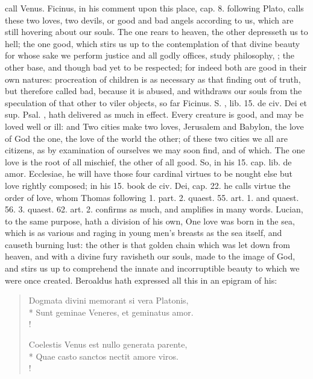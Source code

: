 {call Venus. Ficinus, in his comment upon this place, cap. 8. following
Plato, calls these two loves, two devils, or good and bad angels
according to us, which are still hovering about our souls. The
one rears to heaven, the other depresseth us to hell; the one good,
which stirs us up to the contemplation of that divine beauty for whose
sake we perform justice and all godly offices, study philosophy, \etc{};
the other base, and though bad yet to be respected; for indeed both are
good in their own natures: procreation of children is as necessary as
that finding out of truth, but therefore called bad, because it is
abused, and withdraws our souls from the speculation of that other to
viler objects, so far Ficinus. S. \Austin{}, lib. 15. de civ. Dei et sup.
Psal. , hath delivered as much in effect. Every creature is
good, and may be loved well or ill: and Two cities make two
loves, Jerusalem and Babylon, the love of God the one, the love of the
world the other; of these two cities we all are citizens, as by
examination of ourselves we may soon find, and of which. The one love
is the root of all mischief, the other of all good. So, in his 15. cap.
lib. de amor. Ecclesiae, he will have those four cardinal virtues to be
nought else but love rightly composed; in his 15. book de civ. Dei,
cap. 22. he calls virtue the order of love, whom Thomas following 1.
part. 2. quaest. 55. art. 1. and quaest. 56. 3. quaest. 62. art. 2.
confirms as much, and amplifies in many words. Lucian, to the
same purpose, hath a division of his own, One love was born in the sea,
which is as various and raging in young men's breasts as the sea
itself, and causeth burning lust: the other is that golden chain which
was let down from heaven, and with a divine fury ravisheth our souls,
made to the image of God, and stirs us up to comprehend the innate and
incorruptible beauty to which we were once created. Beroaldus hath
expressed all this in an epigram of his:

\begin{latin}
\begin{verse}%
Dogmata divini memorant si vera Platonis,\\*
Sunt geminae Veneres, et geminatus amor.\\!

Coelestis Venus est nullo generata parente,\\*
Quae casto sanctos nectit amore viros.\\!


\end{verse}
\end{latin}}
